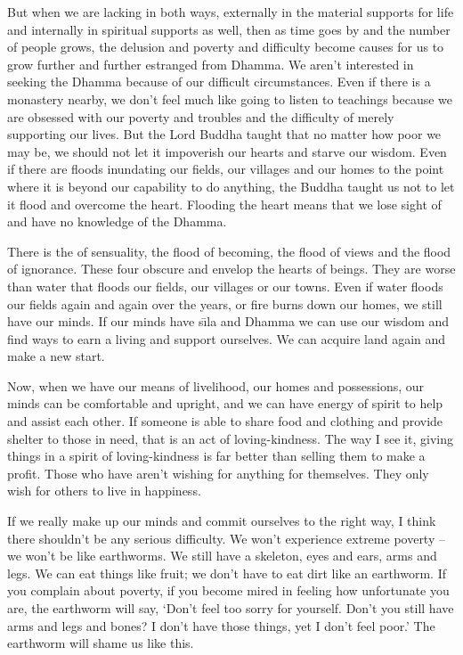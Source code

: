 But when we are lacking in both ways, externally in the material supports for life and internally in spiritual supports as well, then as time goes by and the number of people grows, the delusion and poverty and difficulty become causes for us to grow further and further estranged from Dhamma. We aren't interested in seeking the Dhamma because of our difficult circumstances. Even if there is a monastery nearby, we don't feel much like going to listen to teachings because we are obsessed with our poverty and troubles and the difficulty of merely supporting our lives. But the Lord Buddha taught that no matter how poor we may be, we should not let it impoverish our hearts and starve our wisdom. Even if there are floods inundating our fields, our villages and our homes to the point where it is beyond our capability to do anything, the Buddha taught us not to let it flood and overcome the heart. Flooding the heart means that we lose sight of and have no knowledge of the Dhamma. 

There is the  of sensuality, the flood of becoming, the flood of views and the flood of ignorance. These four obscure and envelop the hearts of beings. They are worse than water that floods our fields, our villages or our towns. Even if water floods our fields again and again over the years, or fire burns down our homes, we still have our minds. If our minds have s\={\i}la and Dhamma we can use our wisdom and find ways to earn a living and support ourselves. We can acquire land again and make a new start. 

Now, when we have our means of livelihood, our homes and possessions, our minds can be comfortable and upright, and we can have energy of spirit to help and assist each other. If someone is able to share food and clothing and provide shelter to those in need, that is an act of loving-kindness. The way I see it, giving things in a spirit of loving-kindness is far better than selling them to make a profit. Those who have  aren't wishing for anything for themselves. They only wish for others to live in happiness. 

If we really make up our minds and commit ourselves to the right way, I think there shouldn't be any serious difficulty. We won't experience \mbox{extreme} poverty -- we won't be like earthworms. We still have a skeleton, eyes and ears, arms and legs. We can eat things like fruit; we don't have to eat dirt like an earthworm. If you complain about poverty, if you become mired in feeling how unfortunate you are, the earthworm will say, `Don't feel too sorry for yourself. Don't you still have arms and legs and bones? I don't have those things, yet I don't feel poor.' The earthworm will shame us like this. 

